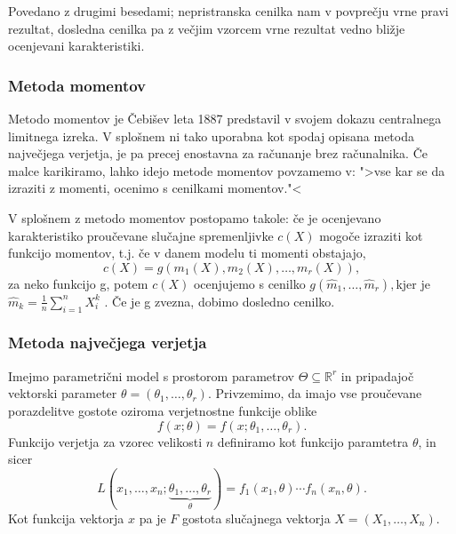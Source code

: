 \documentclass[12pt,a4paper]{amsart}
\theoremstyle{definition} %
\theoremstyle{plain} %
\begin{document}
Povedano z drugimi besedami; nepristranska cenilka nam v povprečju vrne pravi rezultat, dosledna cenilka pa z večjim vzorcem vrne rezultat vedno
bližje ocenjevani karakteristiki.

\subsubsection{Metoda momentov}
Metodo momentov je Čebišev leta 1887 predstavil v svojem dokazu centralnega limitnega izreka. V splošnem ni tako uporabna kot spodaj opisana metoda največjega
verjetja, je pa precej enostavna za računanje brez računalnika. Če malce karikiramo, lahko idejo metode momentov povzamemo v:
">vse kar se da izraziti z momenti, ocenimo s cenilkami momentov."<

V splošnem z metodo momentov postopamo takole: če je ocenjevano karakteristiko proučevane slučajne spremenljivke $c(X)$ mogoče izraziti kot funkcijo 
momentov, t.j. če v danem modelu ti momenti obstajajo, 
\[
    c(X) = g(m_{1}(X), m_{2}(X),\ldots,m_{r}(X)),
\] za neko funkcijo g, potem $c(X)$ ocenjujemo s cenilko $g(\hat{m}_{1},\ldots,\hat{m}_{r}), $kjer je $\hat{m}_{k} = \frac{1}{n}\sum_{i=1}^{n}X^{k}_{i}$ . Če je g zvezna, dobimo dosledno cenilko.

\subsubsection{Metoda največjega verjetja} %
Imejmo parametrični model s prostorom parametrov $\Theta \subseteq \mathbb{R}^{r}$ in pripadajoč vektorski parameter $\theta = (\theta_{1},\ldots,\theta_{r}).$
Privzemimo, da imajo vse proučevane porazdelitve gostote oziroma verjetnostne funkcije oblike
\[
    f(x;\theta) = f(x;\theta_{1},\ldots,\theta_{r}).
\]
Funkcijo verjetja za vzorec velikosti $n$ definiramo kot funkcijo paramtetra $\theta$, in sicer
\[
    L(x_{1},\ldots,x_{n};\underbrace{\theta_{1},\ldots,\theta_{r}}_{\theta}) = f_{1}(x_{1},\theta)\cdots f_{n}(x_{n},\theta).
\]
Kot funkcija vektorja $x$ pa je $F$ gostota slučajnega vektorja $X = (X_{1},\ldots,X_{n}).$
\end{document}

